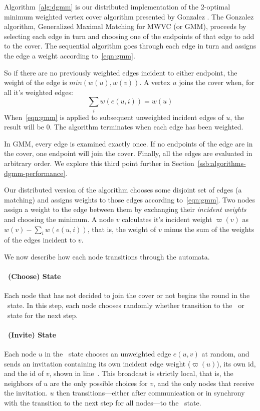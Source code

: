 \label{sec:dgmm-description}

Algorithm~\ref{alg:dgmm} is our distributed implementation of the 2-optimal minimum weighted vertex cover algorithm presented by Gonzalez \cite{Gonzalez1995129}. The Gonzalez algorithm, Generalized Maximal Matching for MWVC (or GMM), proceeds by selecting each edge in turn and choosing one of the endpoints of that edge to add to the cover. The sequential algorithm goes through each edge in turn and assigns the edge a weight according to~\eqref{eqn:gmm}.



So if there are no previously weighted edges incident to either endpoint, the weight of the edge is $min(w(u),w(v))$. A vertex $u$ joins the cover when, for all it's weighted edges: \begin{equation}\sum_i w(e(u,i)) = w(u) \label{eqn:sat} \end{equation} When~\eqref{eqn:gmm} is applied to subsequent unweighted incident edges of $u$, the result will be 0. The algorithm terminates when each edge has been weighted. 

In GMM, every edge is examined exactly once. If no endpoints of the edge are in the cover, one endpoint will join the cover. Finally, all the edges are evaluated in arbitrary order. We explore this third point further in Section~\ref{ssb:algorithms-dgmm-performance}. 

Our distributed version of the algorithm chooses some disjoint set of edges (a matching) and assigns weights to those edges according to~\eqref{eqn:gmm}. Two nodes assign a weight to the edge between them by exchanging their {\em incident weights} and choosing the minimum. A node $v$ calculates it's incident weight $\varpi(v)$ as $w(v) - \sum_i w(e(u,i))$, that is, the weight of $v$ minus the sum of the weights of the edges incident to $v$.  

We now describe how each node transitions through the automata.

\paragraph{\cCd\ (Choose) State} 
Each node that has not decided to join the cover or not begins the round in the \cCd\ state. In this step, each node chooses randomly whether transition to the \cId\ or \cLd\ state for the next step. 

\paragraph{\cId\ (Invite) State}
Each node $u$ in the \cId\ state chooses an unweighted edge $e(u,v)$ at random, and sends an invitation containing its own incident edge weight ($\varpi(u)$), its own id, and the id of $v$, shown in line~. This broadcast is strictly local, that is, the neighbors of $u$ are the only possible choices for $v$, and the only nodes that receive the invitation. $u$ then transitions---either after communication or in synchrony with the transition to the next step for all nodes---to the \cWd\ state. 

